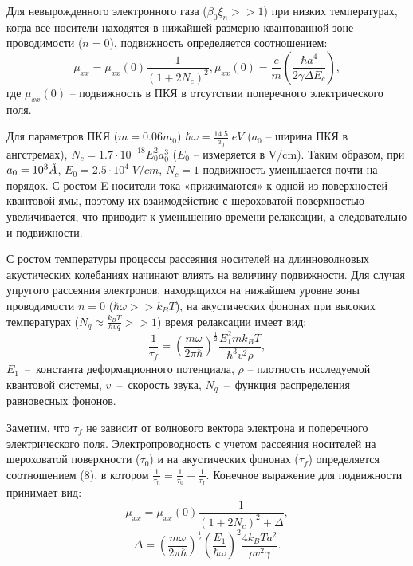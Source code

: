 Для невырожденного электронного газа ($\beta _{0} \xi _{n} >>1$) при низких температурах, когда все носители находятся в нижайшей размерно-квантованной зоне проводимости ($n=0$), подвижность определяется соотношением:
\begin{equation} \label{eq:41_90}
\mu _{xx} =\mu _{xx} (0)\frac{1}{\left(1+2N_{c} \right)^{2} } , \mu _{xx} (0)=\frac{e}{m} \left(\frac{\hbar a^{4} }{2\gamma \Delta E_{c} } \right),
\end{equation} 
где $\mu _{xx} (0)$ -- подвижность в ПКЯ в отсутствии поперечного электрического поля.

Для параметров ПКЯ ($m=0.06m_{0} $) $\hbar \omega =\frac{14.5}{a_{0} } {\mathrm \; eV}$ ($a_{0} $ -- ширина ПКЯ в ангстремах), $N_{c} =1.7\cdot 10^{-18} E_{0}^{2} a_{0}^{3} $ ($E_{0} $ -- измеряется в V/cm). Таким образом, при $a_{0} =10^{3} \AA$, $E_{0} =2.5\cdot 10^{4} {\mathrm \; V/cm}$, $N_{c} =1$ подвижность уменьшается почти на порядок. С ростом E носители тока «прижимаются» к одной из поверхностей квантовой ямы, поэтому их взаимодействие с шероховатой поверхностью увеличивается, что приводит к уменьшению времени релаксации, а следовательно и подвижности.

С ростом температуры процессы рассеяния носителей на длинноволновых акустических колебаниях начинают влиять на величину подвижности. Для случая упругого рассеяния электронов, находящихся на нижайшем уровне зоны проводимости $n=0$ ($\hbar \omega >>k_{B} T$), на акустических фононах при высоких температурах ($N_{q} \approx \frac{k_{B} T}{hvq} >>1$) время релаксации имеет вид:
\begin{equation} \label{eq:41_100}
\frac{1}{\tau _{f} } =\left(\frac{m\omega }{2\pi \hbar } \right)^{\frac{1}{2} } \frac{E_{1}^{2} mk_{B} T}{\hbar ^{3} v^{2} \rho } , 
\end{equation} 
$E_{1} $~--~константа деформационного потенциала, $\rho $ -- плотность исследуемой квантовой системы, $v$~--~скорость звука, $N_{q} $~--~функция распределения равновесных фононов.

Заметим, что $\tau _{f} $ не зависит от волнового вектора электрона и поперечного электрического поля. Электропроводность с учетом рассеяния носителей на шероховатой поверхности ($\tau _{0} $) и на акустических фононах ($\tau _{f} $) определяется соотношением (8), в котором $\frac{1}{\tau _{n} } =\frac{1}{\tau _{0} } +\frac{1}{\tau _{f} } $. Конечное выражение для подвижности принимает вид:
\begin{equation} \label{eq:41_110}
\mu _{xx} =\mu _{xx} (0)\frac{1}{\left(1+2N_{c} \right)^{2} +\Delta } , 
\end{equation} 
\[
\Delta =\left(\frac{m\omega }{2\pi \hbar } \right)^{\frac{1}{2} } \left(\frac{E_{1} }{\hbar \omega } \right)^{2} \frac{4k_{B} Ta^{2} }{\rho v^{2} \gamma }. 
\] 

